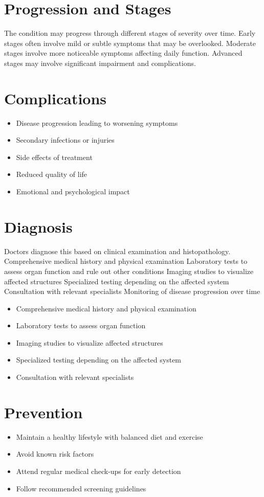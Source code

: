 \section{Progression and Stages}
The condition may progress through different stages of severity over time. Early stages often involve mild or subtle symptoms that may be overlooked. Moderate stages involve more noticeable symptoms affecting daily function. Advanced stages may involve significant impairment and complications.
\section{Complications}
\begin{itemize}[noitemsep]
  \item Disease progression leading to worsening symptoms
  \item Secondary infections or injuries
  \item Side effects of treatment
  \item Reduced quality of life
  \item Emotional and psychological impact
\end{itemize}
\section{Diagnosis}
Doctors diagnose this based on clinical examination and histopathology. Comprehensive medical history and physical examination Laboratory tests to assess organ function and rule out other conditions Imaging studies to visualize affected structures Specialized testing depending on the affected system Consultation with relevant specialists Monitoring of disease progression over time

\begin{itemize}[noitemsep]
  \item Comprehensive medical history and physical examination
  \item Laboratory tests to assess organ function
  \item Imaging studies to visualize affected structures
  \item Specialized testing depending on the affected system
  \item Consultation with relevant specialists
\end{itemize}
\section{Prevention}
\begin{itemize}[noitemsep]
  \item Maintain a healthy lifestyle with balanced diet and exercise
  \item Avoid known risk factors
  \item Attend regular medical check-ups for early detection
  \item Follow recommended screening guidelines
\end{itemize}
